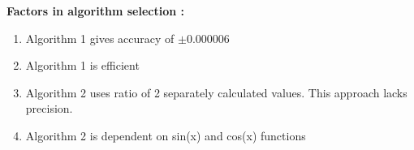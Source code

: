\documentclass[12pt]{article}
\begin{document}
\textbf{Factors in algorithm selection :}
\begin{enumerate}
    \item Algorithm 1 gives accuracy of $\pm 0.000006$
    \item Algorithm 1 is efficient 
    \item Algorithm 2 uses ratio of 2 separately calculated values. This approach lacks precision.
    \item Algorithm 2 is dependent on sin(x) and cos(x) functions
    
    
\end{enumerate}
\end{document}
